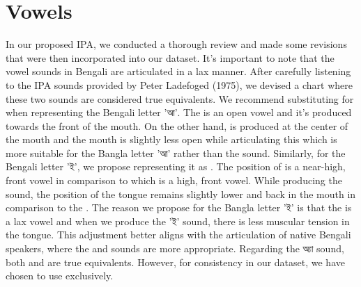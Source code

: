 \section{Vowels}
In our proposed IPA, we conducted a thorough review and made some revisions that were then incorporated into our dataset. It's important to note that the vowel sounds in Bengali are articulated in a lax manner. After carefully listening to the IPA sounds provided by Peter Ladefoged (1975), we devised a chart where these two sounds are considered true equivalents. We recommend substituting  for  when representing the Bengali letter \textbengali{'আ'}. The  is an open vowel and it’s produced towards the front of the mouth.
On the other hand,  is produced at the center of the mouth and the mouth is slightly less open while articulating this which is more suitable for the Bangla letter \textbengali{'আ'} rather than the sound.  
 Similarly, for the Bengali letter \textbengali{'ই'}, we propose representing it as . The position of  is a near-high, front vowel in comparison to  which is a high, front vowel. While producing the sound, the position of the tongue remains slightly lower and back in the mouth in comparison to the . The reason we propose  for the Bangla letter \textbengali{'ই'} is that the is a lax vowel and when we produce the \textbengali{'ই'} sound, there is less muscular tension in the tongue.  This adjustment better aligns with the articulation of native Bengali speakers, where the  and  sounds are more appropriate. Regarding the \textbengali{অ্যা} sound, both  and  are true equivalents. However, for consistency in our dataset, we have chosen to use  exclusively.

\begin{table}[!htbp]
    \centering
    \caption{Bengali Proposed Vowel Chart}
    \label{tab:proposed_framework_vowel}
\end{table}


